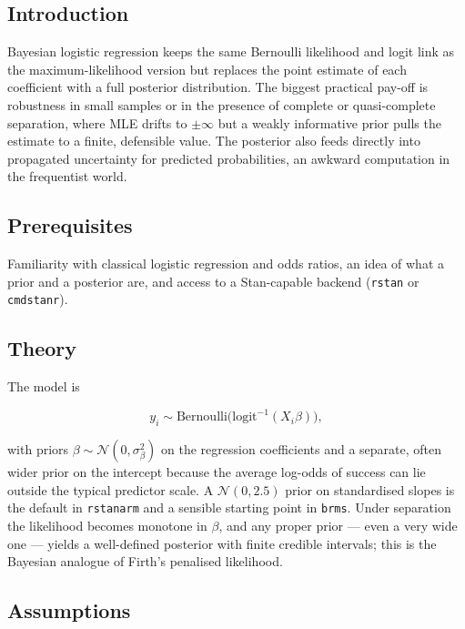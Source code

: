 \documentclass[
]{article}
\author{}
\date{\vspace{-2.5em}}
\begin{document}
\subsection{Introduction}\label{introduction}

Bayesian logistic regression keeps the same Bernoulli likelihood and
logit link as the maximum-likelihood version but replaces the point
estimate of each coefficient with a full posterior distribution. The
biggest practical pay-off is robustness in small samples or in the
presence of complete or quasi-complete separation, where MLE drifts to
\(\pm\infty\) but a weakly informative prior pulls the estimate to a
finite, defensible value. The posterior also feeds directly into
propagated uncertainty for predicted probabilities, an awkward
computation in the frequentist world.

\subsection{Prerequisites}\label{prerequisites}

Familiarity with classical logistic regression and odds ratios, an idea
of what a prior and a posterior are, and access to a Stan-capable
backend (\texttt{rstan} or \texttt{cmdstanr}).

\subsection{Theory}\label{theory}

The model is

\[y_i \sim \mathrm{Bernoulli}\bigl(\mathrm{logit}^{-1}(X_i \beta)\bigr),\]

with priors \(\beta \sim \mathcal N(0, \sigma_\beta^2)\) on the
regression coefficients and a separate, often wider prior on the
intercept because the average log-odds of success can lie outside the
typical predictor scale. A \(\mathcal N(0, 2.5)\) prior on standardised
slopes is the default in \texttt{rstanarm} and a sensible starting point
in \texttt{brms}. Under separation the likelihood becomes monotone in
\(\beta\), and any proper prior --- even a very wide one --- yields a
well-defined posterior with finite credible intervals; this is the
Bayesian analogue of Firth's penalised likelihood.

\subsection{Assumptions}\label{assumptions}
\end{document}
